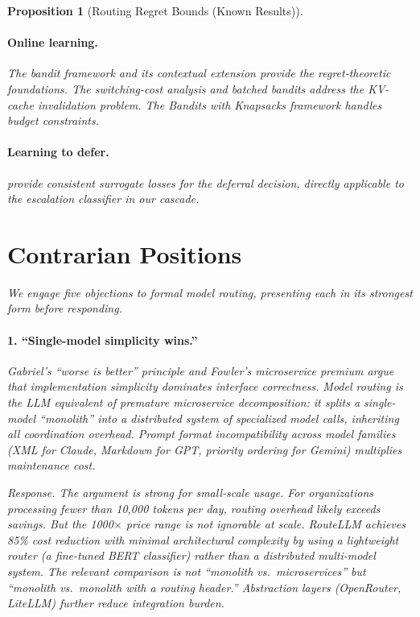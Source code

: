 \documentclass[11pt, a4paper, copyright]{googledeepmind}
\newtheorem{proposition}{Proposition}[section]
\begin{document}
\begin{proposition}[Routing Regret Bounds (Known Results)]
\paragraph{Online learning.} The bandit framework \citep{auer2002, lattimore2020bandits} and its contextual extension \citep{li2010linucb, agarwal2014monster} provide the regret-theoretic foundations. The switching-cost analysis \citep{dekel2014switching} and batched bandits \citep{perchet2016batched} address the KV-cache invalidation problem. The Bandits with Knapsacks framework \citep{badanidiyuru2018bwk} handles budget constraints.

\paragraph{Learning to defer.} \citet{mozannar2020defer} provide consistent surrogate losses for the deferral decision, directly applicable to the escalation classifier in our cascade.


\section{Contrarian Positions}
\label{sec:contrarian}

We engage five objections to formal model routing, presenting each in its strongest form before responding.

\paragraph{1. ``Single-model simplicity wins.''} Gabriel's ``worse is better'' principle \citep{gabriel1989} and Fowler's microservice premium argue that implementation simplicity dominates interface correctness. Model routing is the LLM equivalent of premature microservice decomposition: it splits a single-model ``monolith'' into a distributed system of specialized model calls, inheriting all coordination overhead. Prompt format incompatibility across model families (XML for Claude, Markdown for GPT, priority ordering for Gemini) multiplies maintenance cost.

\emph{Response.} The argument is strong for small-scale usage. For organizations processing fewer than 10,000 tokens per day, routing overhead likely exceeds savings. But the 1000$\times$ price range is not ignorable at scale. RouteLLM achieves 85\% cost reduction with minimal architectural complexity by using a lightweight router (a fine-tuned BERT classifier) rather than a distributed multi-model system. The relevant comparison is not ``monolith vs.\ microservices'' but ``monolith vs.\ monolith with a routing header.'' Abstraction layers (OpenRouter, LiteLLM) further reduce integration burden.


\end{proposition}
\end{document}
